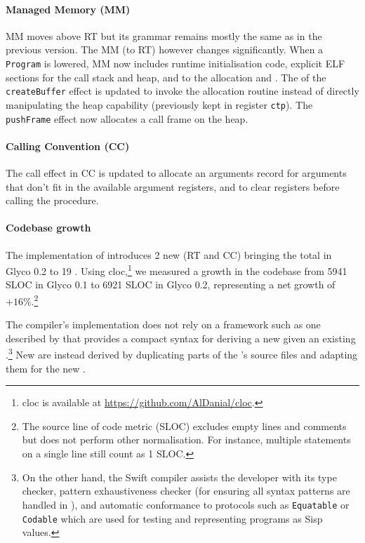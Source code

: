 \documentclass[main.tex]{subfiles}
\begin{document}
\paragraph{Managed Memory (MM)} MM moves above RT but its grammar remains mostly the same as in the previous version. The MM (to RT)  however changes significantly. When a \texttt{Program} is lowered, MM now includes runtime initialisation code, explicit ELF sections for the call stack and heap, and  to the allocation and  . The  of the \texttt{createBuffer} effect is updated to invoke the allocation routine instead of directly manipulating the heap capability (previously kept in register \texttt{ctp}). The \texttt{pushFrame} effect now allocates a call frame on the heap.

\paragraph{Calling Convention (CC)} The call effect in CC is updated to allocate an arguments record for arguments that don't fit in the available argument registers, and to clear registers before calling the procedure.

\paragraph{Codebase growth} The implementation of  introduces 2 new  (RT and CC) bringing the total in Glyco 0.2 to 19 . Using cloc,\footnote{cloc is available at \url{https://github.com/AlDanial/cloc}.} we measured a growth in the codebase from 5941 SLOC in Glyco 0.1 to 6921 SLOC in Glyco 0.2, representing a net growth of $+16\%$.\footnote{The source line of code metric (SLOC) excludes empty lines and comments but does not perform other normalisation. For instance, multiple statements on a single line still count as 1 SLOC.}

The compiler's implementation does not rely on a framework such as one described by \cite{commcomp} that provides a compact syntax for deriving a new  given an existing .\footnote{On the other hand, the Swift compiler assists the developer with its type checker, pattern exhaustiveness checker (for ensuring all syntax patterns are handled in ), and automatic conformance to protocols such as \texttt{Equatable} or \texttt{Codable} which are used for testing and representing programs as Sisp values.} New  are instead derived by duplicating parts of the 's source files and adapting them for the new .
\end{document}
